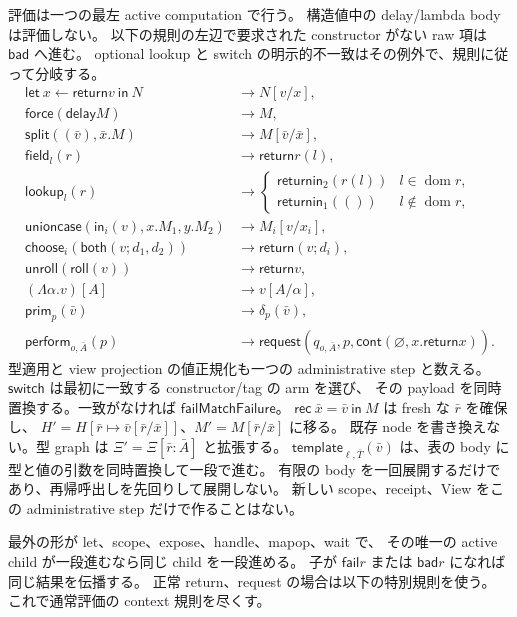 \documentclass[11pt,a4paper]{article}
\newcommand{\Ret}{\mathsf{return}}
\newcommand{\Req}{\mathsf{request}}
\newcommand{\Fail}{\mathsf{fail}}
\newcommand{\Bad}{\mathsf{bad}}
\newcommand{\Force}{\mathsf{force}}
\newcommand{\Delay}{\mathsf{delay}}
\newcommand{\dom}{\operatorname{dom}}
\begin{document}
評価は一つの最左 active computation で行う。
構造値中の delay/lambda body は評価しない。
以下の規則の左辺で要求された constructor がない raw 項は \(\Bad\) へ進む。
optional lookup と switch の明示的不一致はその例外で、規則に従って分岐する。
\begin{align*}
 \mathsf{let}\ x\leftarrow\Ret v\ \mathsf{in}\ N&\longrightarrow N[v/x],\\
 \Force(\Delay M)&\longrightarrow M,\\
 \mathsf{split}((\bar v),\bar x.M)&\longrightarrow M[\bar v/\bar x],\\
 \mathsf{field}_l(r)&\longrightarrow\Ret r(l),\\
 \mathsf{lookup}_l(r)&\longrightarrow
 \begin{cases}\Ret\mathsf{in}_2(r(l))&l\in\dom r,\\
 \Ret\mathsf{in}_1(())&l\notin\dom r,\end{cases}\\
 \mathsf{unioncase}(\mathsf{in}_i(v),x.M_1,y.M_2)&\longrightarrow M_i[v/x_i],\\
 \mathsf{choose}_i(\mathsf{both}(v;d_1,d_2))&\longrightarrow\Ret(v;d_i),\\
 \mathsf{unroll}(\mathsf{roll}(v))&\longrightarrow\Ret v,\\
 (\Lambda\alpha.v)[A]&\longrightarrow v[A/\alpha],\\
 \mathsf{prim}_p(\bar v)&\longrightarrow\delta_p(\bar v),\\
 \mathsf{perform}_{o,\bar A}(p)&\longrightarrow
 \Req(q_{o,\bar A},p,\mathsf{cont}(\varnothing,x.\Ret x)).
\end{align*}
型適用と view projection の値正規化も一つの administrative step と数える。
\(\mathsf{switch}\) は最初に一致する constructor/tag の arm を選び、
その payload を同時置換する。一致がなければ \(\Fail\mathsf{MatchFailure}\)。
\(\mathsf{rec}\ \bar x=\bar v\ \mathsf{in}\ M\) は fresh な \(\bar r\) を確保し、
\(H'=H[\bar r\mapsto\bar v[\bar r/\bar x]]\)、\(M'=M[\bar r/\bar x]\) に移る。
既存 node を書き換えない。型 graph は \(\Xi'=\Xi[\bar r:\bar A]\) と拡張する。
\(\mathsf{template}_{\ell,\bar T}(\bar v)\) は、表の body に型と値の引数を同時置換して一段で進む。
有限の body を一回展開するだけであり、再帰呼出しを先回りして展開しない。
新しい scope、receipt、View をこの administrative step だけで作ることはない。

最外の形が let、scope、expose、handle、mapop、wait で、
その唯一の active child が一段進むなら同じ child を一段進める。
子が \(\Fail r\) または \(\Bad r\) になれば同じ結果を伝播する。
正常 return、request の場合は以下の特別規則を使う。
これで通常評価の context 規則を尽くす。
\end{document}
